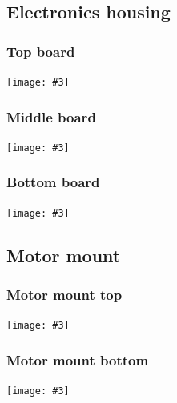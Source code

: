 \documentclass[a4paper]{IEEEtran}
\newcommand{\srbdrawing}[3][0.87]{
\subsubsection{#2}
\mbox{}
\noindent
\begin{center}
\texttt{[image: \#3]}
\end{center}
\newpage
}
\begin{document}
\subsection{Electronics housing}
\srbdrawing{Top board}{top-board-drawing.pdf}
\srbdrawing{Middle board}{middle-board-drawing.pdf}
\srbdrawing{Bottom board}{bottom-board-drawing.pdf}

\subsection{Motor mount}
\srbdrawing{Motor mount top}{motor-mount-top-drawing.pdf}
\srbdrawing{Motor mount bottom}{motor-mount-bottom-drawing.pdf}
\end{document}
